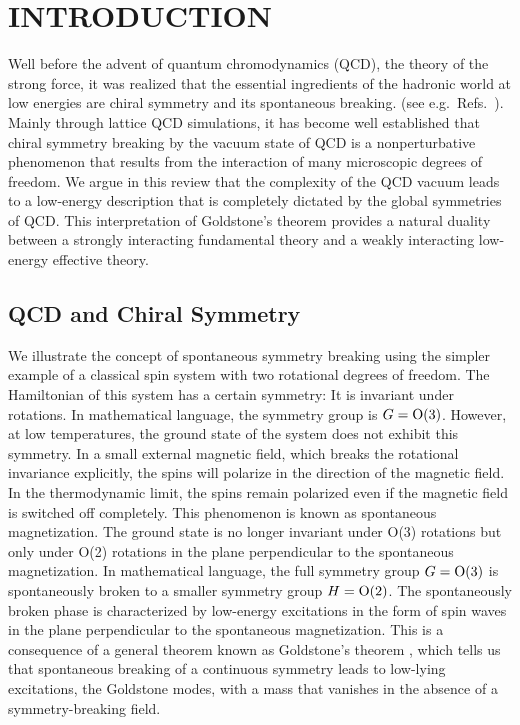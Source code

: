 \maketitle

\section{INTRODUCTION}
\label{sec1}

Well before the advent of quantum chromodynamics (QCD), the theory of
the strong force, it was realized that the essential ingredients of
the hadronic world at low energies are chiral symmetry and its
spontaneous breaking.  (see e.g.\ Refs.~\cite{chiralgel,benlee}).
Mainly through lattice QCD simulations, it has become well established
that chiral symmetry breaking by the vacuum state of QCD is a
nonperturbative phenomenon that results from the interaction of many
microscopic degrees of freedom.  We argue in this review that the
complexity of the QCD vacuum leads to a low-energy description that is
completely dictated by the global symmetries of QCD.  This
interpretation of Goldstone's theorem provides a natural duality
between a strongly interacting fundamental theory and a weakly
interacting low-energy effective theory.


\subsection{QCD and Chiral Symmetry}
\label{sec1.1}


We illustrate the concept of spontaneous symmetry breaking using the
simpler example of a classical spin system with two rotational degrees
of freedom.  The Hamiltonian of this system has a certain symmetry: It
is invariant under rotations.  In mathematical language, the symmetry
group is $G={\rm O}(3)$.  However, at low temperatures, the ground
state of the system does not exhibit this symmetry.  In a
small external magnetic field, which breaks the rotational invariance
explicitly, the spins will polarize in the direction of the magnetic
field. In the thermodynamic limit, the spins remain polarized even if
the magnetic field is switched off completely.  This phenomenon is
known as spontaneous magnetization.  The ground state is no longer
invariant under O(3) rotations but only under O(2) rotations in the
plane perpendicular to the spontaneous magnetization.  In mathematical
language, the full symmetry group $G={\rm O}(3)$ is
spontaneously broken to a smaller symmetry group $H={\rm O}(2)$. The
spontaneously broken phase is characterized by low-energy excitations
in the form of spin waves in the plane perpendicular to the
spontaneous magnetization.  This is a consequence of a general theorem
known as Goldstone's theorem \cite{Goldstone}, which tells us that
spontaneous breaking of a continuous symmetry leads to low-lying
excitations, the Goldstone modes, with a mass that vanishes in the
absence of a symmetry-breaking field.

